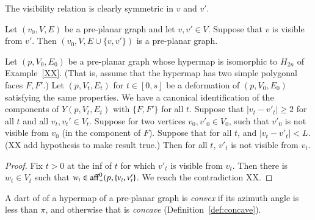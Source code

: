 The visibility relation is clearly symmetric in $v$ and $v'$.

\begin{lemma} Let $(v_0,V,E)$ be a pre-planar graph and let $v,v'\in V$.
Suppose that $v$ is visible from $v'$.  Then
$(v_0,V,E\cup\{v,v'\})$ is a pre-planar graph.
\end{lemma}

\begin{lemma}  Let $(p,V_0,E_0)$ be a pre-planar graph whose hypermap
is isomorphic to $H_{2n}$ of Example~\ref{XX}.  (That is, assume that
the hypermap has two simple polygonal faces $F,F'$.)  Let $(p,V_t,E_t)$
for $t\in[0,s]$ be a deformation of $(p,V_0,E_0)$ satisfying the same
properties.  We have a canonical identification of the components
of $Y(p,V_t,E_t)$ with $\{F,F'\}$ for all $t$.
Suppose that $|v_t-v'_t|\ge 2$ for all $t$ and all $v_t,v_t'\in V_t$.  
Suppose for two vertices $v_0,v'_0\in V_0$, such that $v'_0$
is not visible from $v_0$ (in the component of $F$).
Suppose that for all $t$, and $|v_t-v'_t|< L$.
(XX add hypothesis to make result true.)
Then for all $t$, $v'_t$ is not visible from $v_t$.
\end{lemma}

\begin{proof} Fix $t>0$ at the inf of $t$ for which $v'_t$ is visible
from $v_t$.   Then there is $w_t\in V_t$ such that
$w_t\in {\operatorname{aff}}_+^0(p,\{v_t,v_t'\}$.  We reach the contradiction XX.
\end{proof}



\begin{definition}
A dart of of a hypermap of a pre-planar graph is {\it convex\/}
if its azimuth angle is less than $\pi$, and otherwise that is {\it
concave}
(Definition~\ref{def:concave}).
%
\end{definition}



    \label{sec:proof-2}





